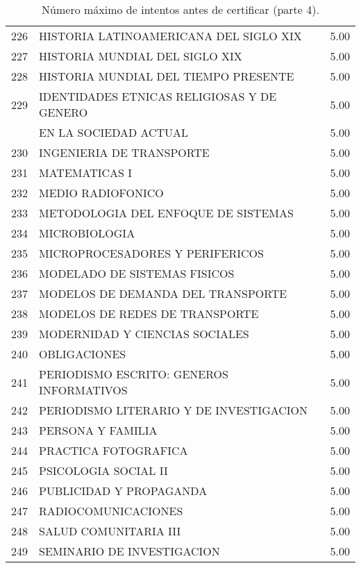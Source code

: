 \documentclass[12pt]{article}
\begin{document}
\begin{table}[ht]
{\begin{tabular}{rlr}
  226 & HISTORIA LATINOAMERICANA DEL SIGLO XIX & 5.00 \\ 
  227 & HISTORIA MUNDIAL DEL SIGLO XIX & 5.00 \\ 
  228 & HISTORIA MUNDIAL DEL TIEMPO PRESENTE & 5.00 \\ 
 229 & IDENTIDADES ETNICAS RELIGIOSAS Y DE GENERO & 5.00 \\
  & EN LA SOCIEDAD ACTUAL & 5.00 \\ 
  230 & INGENIERIA DE TRANSPORTE & 5.00 \\ 
  231 & MATEMATICAS I & 5.00 \\ 
  232 & MEDIO RADIOFONICO & 5.00 \\ 
  233 & METODOLOGIA DEL ENFOQUE DE SISTEMAS & 5.00 \\ 
  234 & MICROBIOLOGIA & 5.00 \\ 
  235 & MICROPROCESADORES Y PERIFERICOS & 5.00 \\ 
  236 & MODELADO DE SISTEMAS FISICOS & 5.00 \\ 
  237 & MODELOS DE DEMANDA DEL TRANSPORTE & 5.00 \\ 
  238 & MODELOS DE REDES DE TRANSPORTE & 5.00 \\ 
  239 & MODERNIDAD Y CIENCIAS SOCIALES & 5.00 \\ 
  240 & OBLIGACIONES & 5.00 \\ 
  241 & PERIODISMO ESCRITO: GENEROS INFORMATIVOS & 5.00 \\ 
  242 & PERIODISMO LITERARIO Y DE INVESTIGACION & 5.00 \\ 
  243 & PERSONA Y FAMILIA & 5.00 \\ 
  244 & PRACTICA FOTOGRAFICA & 5.00 \\ 
  245 & PSICOLOGIA SOCIAL II & 5.00 \\ 
  246 & PUBLICIDAD Y PROPAGANDA & 5.00 \\ 
  247 & RADIOCOMUNICACIONES & 5.00 \\ 
  248 & SALUD COMUNITARIA III & 5.00 \\ 
  249 & SEMINARIO DE INVESTIGACION & 5.00 \\ 
   \hline
\end{tabular}}
\caption{\label{Num_Max_Intentos_Cert_4} N\'umero m\'aximo de intentos antes de certificar (parte 4).}

\end{table}
\end{document}
